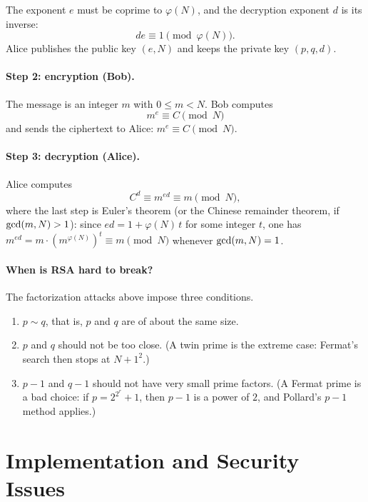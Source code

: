 
The exponent $e$ must be coprime to $\varphi(N)$, and the decryption exponent $d$ is its inverse:
\[
    de\equiv 1\pmod{\varphi(N)}.
\]
Alice publishes the public key $(e,N)$ and keeps the private key $(p,q,d)$.

\paragraph{Step 2: encryption (Bob).}
The message is an integer $m$ with $0\le m<N$. Bob computes
\[
    m^{e}\equiv C\pmod{N}
\]
and sends the ciphertext to Alice: $m^{e}\equiv C\pmod{N}$.

\paragraph{Step 3: decryption (Alice).}
Alice computes
\[
    C^{d}\equiv m^{ed}\equiv m\pmod{N},
\]
where the last step is Euler's theorem (or the Chinese remainder theorem, if $\operatorname{gcd}(m,N)>1$): since $ed=1+\varphi(N)\,t$ for some integer $t$, one has $m^{ed}=m\cdot(m^{\varphi(N)})^{t}\equiv m\pmod{N}$ whenever $\operatorname{gcd}(m,N)=1$.

\paragraph{When is RSA hard to break?}
The factorization attacks above impose three conditions.
\begin{enumerate}[leftmargin=1.6em]
    \item $p\sim q$, that is, $p$ and $q$ are of about the same size.
    \item $p$ and $q$ should not be too close. (A twin prime is the extreme case: Fermat's search then stops at $N+1^2$.)
    \item $p-1$ and $q-1$ should not have very small prime factors. (A Fermat prime is a bad choice: if $p=2^{2^{r}}+1$, then $p-1$ is a power of $2$, and Pollard's $p-1$ method applies.)
\end{enumerate}

\section{Implementation and Security Issues}

